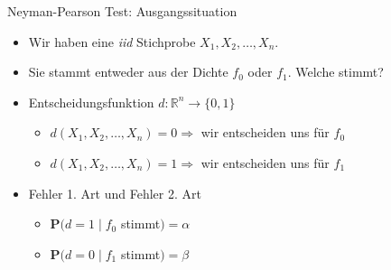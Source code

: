\documentclass[t,11pt]{beamer}
\begin{document}
	\subtitle{}
	\logo{}
	\institute{}
	\date{}
	\subject{}

\addtocounter{framenumber}{-1}

\begin{frame}
\begin{alertblock}{Neyman-Pearson Test: Ausgangssituation}
	\begin{itemize}[<+->]
		\item Wir haben eine \textit{iid} Stichprobe $X_1,X_2,\dots,X_n$.
		\item Sie stammt entweder aus der Dichte $f_0$ oder $f_1$. Welche stimmt?
		\item Entscheidungsfunktion $d:\mathbb{R}^n\to\{0,1 \}$
		\begin{itemize}
			\item $d(X_1,X_2,\dots,X_n)=0\Rightarrow$ wir entscheiden uns für $f_0$
			\item $d(X_1,X_2,\dots,X_n)=1\Rightarrow$ wir entscheiden uns für $f_1$
		\end{itemize}
		\item Fehler 1. Art und Fehler 2. Art
		\begin{itemize}
			\item $\mathbf{P}(d=1\mid f_0$ stimmt$)=\alpha$
			\item $\mathbf{P}(d=0\mid f_1$ stimmt$)=\beta$
		\end{itemize}
	\end{itemize}
\end{alertblock}
\end{frame}
\end{document}
